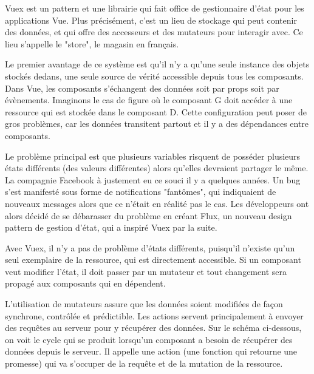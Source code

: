 \documentclass[
    iai, %
    eai, %
]{heig-tb}
\begin{document}
Vuex est un pattern et une librairie qui fait office de gestionnaire d'état pour les applications Vue.
Plus précisément, c'est un lieu de stockage qui peut contenir des données, et qui offre des accesseurs et des mutateurs pour interagir avec.
Ce lieu s'appelle le "store", le magasin en français.

Le premier avantage de ce système est qu'il n'y a qu'une seule instance des objets stockés dedans, une seule source de vérité accessible depuis tous les composants.
Dans Vue, les composants s'échangent des données soit par props soit par évènements.
Imaginons le cas de figure où le composant G doit accéder à une ressource qui est stockée dans le composant D.
Cette configuration peut poser de gros problèmes, car les données transitent partout et il y a des dépendances entre composants.

\newpage
{}

Le problème principal est que plusieurs variables risquent de posséder plusieurs états différents (des valeurs différentes) alors qu'elles devraient partager le même.
La compagnie Facebook à justement eu ce souci il y a quelques années.
Un bug s'est manifesté sous forme de notifications "fantômes", qui indiquaient de nouveaux messages alors que ce n'était en réalité pas le cas.
Les développeurs ont alors décidé de se débarasser du problème en créant Flux, un nouveau design pattern de gestion d'état, qui a inspiré Vuex par la suite.


Avec Vuex, il n'y a pas de problème d'états différents, puisqu'il n'existe qu'un seul exemplaire de la ressource, qui est directement accessible.
Si un composant veut modifier l'état, il doit passer par un mutateur et tout changement sera propagé aux composants qui en dépendent.

\newpage
L'utilisation de mutateurs assure que les données soient modifiées de façon synchrone, contrôlée et prédictible.
Les actions servent principalement à envoyer des requêtes au serveur pour y récupérer des données.
Sur le schéma ci-dessous, on voit le cycle qui se produit lorsqu'un composant a besoin de récupérer des données depuis le serveur.
Il appelle une action (une fonction qui retourne une promesse) qui va s'occuper de la requête et de la mutation de la ressource.

\end{document}
